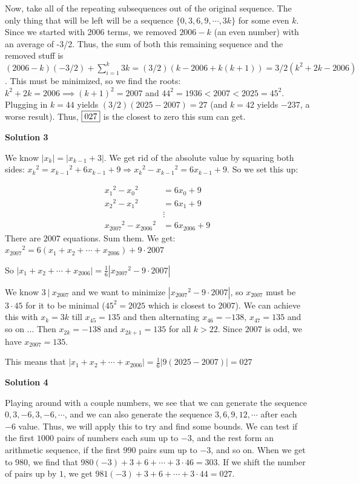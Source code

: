 \begin{enumerate}
 Now, take all of the repeating subsequences out of the original sequence. The only thing that will be left will be a sequence $\{0,3,6,9,\cdots,3k\}$ for some even $k$. Since we started with 2006 terms, we removed $2006 - k$ (an even number) with an average of -3/2. Thus, the sum of both this remaining sequence and the removed stuff is $(2006 - k)( - 3/2) + \sum_{i = 1}^k3k = (3/2)(k - 2006 + k(k + 1)) = 3/2(k^2 + 2k - 2006)$. This must be minimized, so we find the roots: $k^2 + 2k = 2006\implies (k + 1)^2 = 2007$ and $44^2 = 1936 < 2007 < 2025 = 45^2$. Plugging in $k = 44$ yields $(3/2)(2025 - 2007) = 27$ (and $k = 42$ yields $- 237$, a worse result). Thus, $\fbox{027}$ is the closest to zero this sum can get.

 



\textbf{Solution 3}

We know $|x_k| = |x_{k - 1} + 3|$.  We get rid of the absolute value by squaring both sides: ${x_k}^2 = {x_{k - 1}}^2 + 6{x_{k - 1}} + 9\Rightarrow {x_k}^2 - {x_{k - 1}}^2 = 6{x_{k - 1}} + 9$. So we set this up:

 
 \begin{align*} {x_1}^2 - {x_0}^2 & = 6{x_0} + 9 \\ {x_2}^2 - {x_1}^2 & = 6{x_1} + 9 \\ & \vdots \\ {x_{2007}}^2 - {x_{2006}}^2 & = 6{x_{2006}} + 9 \end{align*}
There are $2007$ equations. Sum them. We get:${x_{2007}}^2 = 6\left(x_1 + x_2 + \cdots + x_{2006}\right) + 9\cdot{2007}$

 So $|x_1 + x_2 + \cdots + x_{2006}| = \frac 16 \left|{x_{2007}}^2 - 9\cdot{2007}\right|$

 We know $3\ |\ x_{2007}$ and we want to minimize $\left|{x_{2007}}^2 - 9\cdot{2007}\right|$, so $x_{2007}$ must be $3\cdot{45}$ for it to be minimal ($45^2 = 2025$ which is closest to $2007$). We can achieve this with $x_k=3k$ till $x_{45}=135$ and then alternating $x_{46}=-138$, $x_{47}=135$ and so on ... Then $x_{2k}=-138$ and $x_{2k+1}=135$ for all $k>22$. Since $2007$ is odd, we have $x_{2007}=135$.

 This means that $|x_1 + x_2 + \cdots + x_{2006}| = \frac 16 \left|9(2025 - 2007)\right| = \boxed{027}$




\textbf{Solution 4}

Playing around with a couple numbers, we see that we can generate the sequence $0, 3, -6, 3, -6, \cdots$, and we can also generate the sequence $3, 6, 9, 12, \cdots$ after each $-6$ value. Thus, we will apply this to try and find some bounds. We can test if the first $1000$ pairs of numbers each sum up to $-3$, and the rest form an arithmetic sequence, if the first $990$ pairs sum up to $-3$, and so on. When we get to $980$, we find that $980(-3) + 3 + 6 + \cdots + 3\cdot 46 = 303$. If we shift the number of pairs up by $1$, we get $981(-3) + 3 + 6 + \cdots + 3\cdot 44 = \boxed{027}$.


\end{enumerate}
